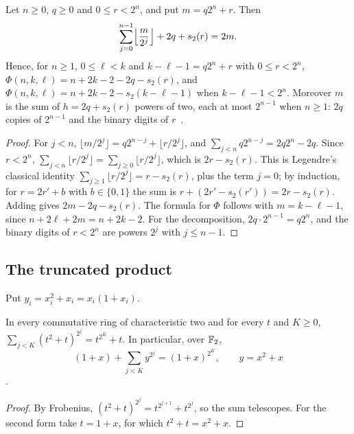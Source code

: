 \begin{lemma}\label{lem:legendre}
Let \(n\ge0\), \(q\ge0\) and \(0\le r<2^n\), and put \(m=q2^n+r\). Then
\[
 \sum_{j=0}^{n-1}\Bigl\lfloor\frac m{2^j}\Bigr\rfloor+2q+s_2(r)=2m .
\]
Hence, for \(n\ge1\), \(0\le\ell<k\) and \(k-\ell-1=q2^n+r\) with \(0\le r<2^n\),
\(\Phi(n,k,\ell)=n+2k-2-2q-s_2(r)\), and \(\Phi(n,k,\ell)=n+2k-2-s_2(k-\ell-1)\) when
\(k-\ell-1<2^n\). Moreover \(m\) is the sum of \(h=2q+s_2(r)\) powers of two, each
at most \(2^{n-1}\) when \(n\ge1\): \(2q\) copies of \(2^{n-1}\) and the binary
digits of \(r\)
\textnormal{\small{}\,}.
\end{lemma}

\begin{proof}
For \(j<n\), \(\lfloor m/2^j\rfloor=q2^{n-j}+\lfloor r/2^j\rfloor\), and
\(\sum_{j<n}q2^{n-j}=2q2^n-2q\). Since \(r<2^n\), \(\sum_{j<n}\lfloor r/2^j\rfloor
=\sum_{j\ge0}\lfloor r/2^j\rfloor\), which is \(2r-s_2(r)\). This is Legendre's
classical identity \(\sum_{j\ge1}\lfloor r/2^j\rfloor=r-s_2(r)\), plus the term
\(j=0\); by induction, for \(r=2r'+b\) with
\(b\in\{0,1\}\) the sum is \(r+(2r'-s_2(r'))=2r-s_2(r)\). Adding gives
\(2m-2q-s_2(r)\). The formula for \(\Phi\) follows with \(m=k-\ell-1\), since
\(n+2\ell+2m=n+2k-2\). For the decomposition, \(2q\cdot2^{n-1}=q2^n\), and the
binary digits of \(r<2^n\) are powers \(2^j\) with \(j\le n-1\).
\end{proof}

\subsection{The truncated product}

Put \(y_i=x_i^2+x_i=x_i(1+x_i)\).

\begin{lemma}\label{lem:telescope}
In every commutative ring of characteristic two and for every \(t\) and \(K\ge0\),
\(\sum_{j<K}(t^2+t)^{2^j}=t^{2^K}+t\). In particular, over \(\mathbb F_2\),
\[
 (1+x)+\sum_{j<K}y^{2^j}=(1+x)^{2^K},\qquad y=x^2+x
\]
.
\end{lemma}

\begin{proof}
By Frobenius, \((t^2+t)^{2^j}=t^{2^{j+1}}+t^{2^j}\), so the sum telescopes. For the
second form take \(t=1+x\), for which \(t^2+t=x^2+x\).
\end{proof}


